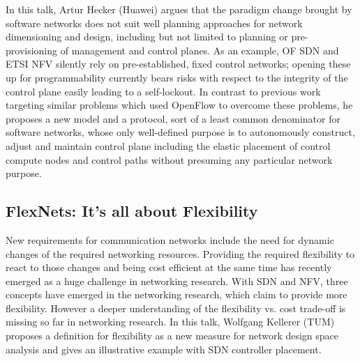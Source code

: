 In this talk, Artur Hecker (Huawei) argues that the paradigm change brought by
software networks does not suit well planning approaches for network
dimensioning and design, including but not limited to planning or
pre-provisioning of management and control planes. As an example, OF \ac{SDN}
and ETSI \ac{NFV} silently rely on pre-established, fixed control networks;
opening these up for programmability currently bears risks
\cite{lschiff:dsn:2016} with respect to the integrity of the control plane
easily leading to a self-lockout.  In contrast to previous work targeting
similar problems which used OpenFlow \cite{lschiff:ccr:2016} to overcome these
problems, he proposes a new model and a protocol, sort of a least common
denominator for software networks, whose only well-defined purpose is to
autonomously construct, adjust and maintain control plane including the
elastic placement of control compute nodes \cite{yliu:icc:2015} and control
paths without presuming any particular network purpose.

\subsection{FlexNets: It's all about Flexibility}

New requirements for communication networks include the need for dynamic
changes of the required networking resources. Providing the required
flexibility to react to those changes and being cost efficient at the same
time has recently emerged as a huge challenge in networking research. With
\ac{SDN} and \ac{NFV}, three concepts have emerged in the networking research,
which claim to provide more flexibility. However a deeper understanding of the
flexibility vs. cost trade-off is missing so far in networking research. In
this talk, Wolfgang Kellerer (TUM) proposes a definition for flexibility as a
new measure for network design space analysis \cite{wkellerer:infocom:2016}
and gives an illustrative example with \ac{SDN} controller placement.

